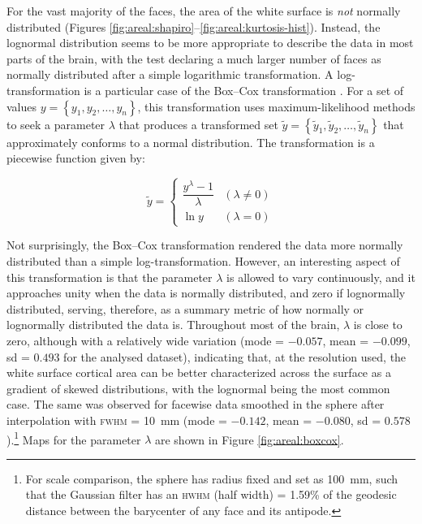 For the vast majority of the faces, the area of the white surface is \emph{not} normally distributed (Figures \ref{fig:areal:shapiro}--\ref{fig:areal:kurtosis-hist}). Instead, the lognormal distribution seems to be more appropriate to describe the data in most parts of the brain, with the test declaring a much larger number of faces as normally distributed after a simple logarithmic transformation. A log-transformation is a particular case of the Box--Cox transformation \citep{Box1964}. For a set of values $y=\left\{ y_1, y_2, \ldots , y_n \right\}$, this transformation uses maximum-likelihood methods to seek a parameter $\lambda$ that produces a transformed set $\tilde{y}=\left\{ \tilde{y}_1, \tilde{y}_2, \ldots , \tilde{y}_n \right\}$ that approximately conforms to a normal distribution. The transformation is a piecewise function given by:

\begin{equation}
\tilde{y} = \left\{ \begin{array}{ll}
\dfrac{y^{\lambda}-1}{\lambda} & (\lambda \neq 0) \\
\ln y & (\lambda = 0)
\end{array} \right.
\end{equation}

Not surprisingly, the Box--Cox transformation rendered the data more normally distributed than a simple log-transformation. However, an interesting aspect of this transformation is that the parameter $\lambda$ is allowed to vary continuously, and it approaches unity when the data is normally distributed, and zero if lognormally distributed, serving, therefore, as a summary metric of how normally or lognormally distributed the data is. Throughout most of the brain, $\lambda$ is close to zero, although with a relatively wide variation (mode = $-0.057$, mean = $-0.099$, sd = $0.493$ for the analysed dataset), indicating that, at the resolution used, the white surface cortical area can be better characterized across the surface as a gradient of skewed distributions, with the lognormal being the most common case. The same was observed for facewise data smoothed in the sphere after interpolation with \textsc{fwhm} = 10~mm (mode = $-0.142$, mean = $-0.080$, sd = $0.578$).\footnote{For scale comparison, the sphere has radius fixed and set as 100~mm, such that the Gaussian filter has an \textsc{hwhm} (half width) = 1.59\% of the geodesic distance between the barycenter of any face and its antipode.} Maps for the parameter $\lambda$ are shown in Figure \ref{fig:areal:boxcox}.

